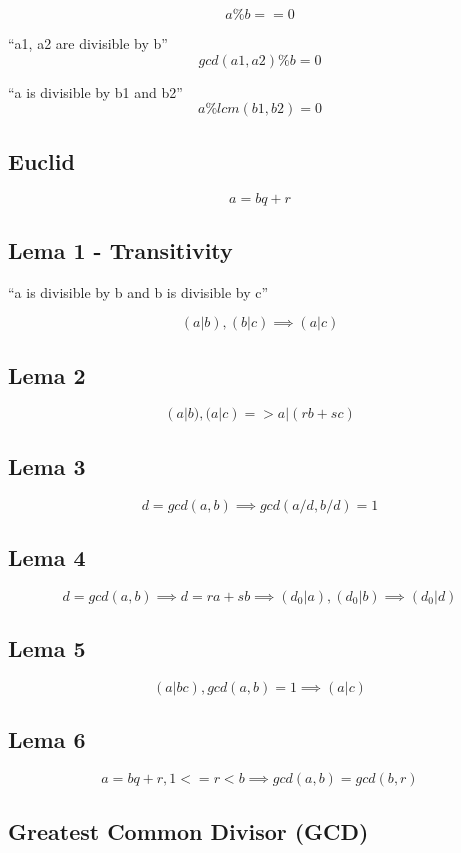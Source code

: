     $$ a \% b == 0 $$

    ``a1, a2 are divisible by b''
    $$ gcd(a1, a2) \% b = 0 $$

    ``a is divisible by b1 and b2''
    $$ a \% lcm(b1, b2) = 0 $$

    \subsection{Euclid}
    $$ a = bq + r $$

    \subsection{Lema 1 - Transitivity}

    ``a is divisible by b and b is divisible by c''

    $$ (a | b) , (b | c)  \implies (a | c) $$

    \subsection{Lema 2}
    $$ (a | b) , (a | c) => a | (rb + sc) $$

    \subsection{Lema 3}
    $$ d = gcd(a, b) \implies gcd(a/d, b/d) = 1 $$

    \subsection{Lema 4}
    $$ d = gcd(a, b) \implies d = ra + sb \implies (d_0 | a), (d_0 | b) \implies (d_0 | d) $$
    
    \subsection{Lema 5}
    $$ (a | bc), gcd(a, b) = 1 \implies (a | c) $$

    \subsection{Lema 6}
    $$ a = bq+r, {1 <= r < b} \implies gcd(a, b) = gcd(b, r) $$

\subsection{Greatest Common Divisor (GCD)}

